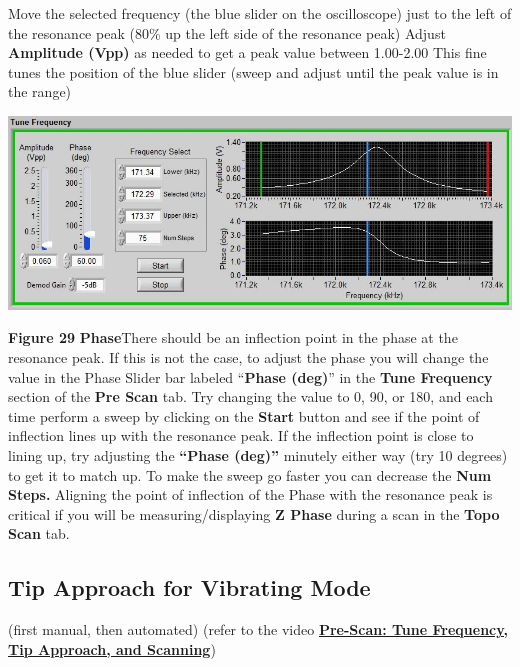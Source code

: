 \documentclass{../lab}
\begin{document}
Move the selected frequency (the blue slider on the oscilloscope) just to the left of the resonance peak (80\% up the left side of the resonance peak)
Adjust \textbf{Amplitude (Vpp)} as needed to get a peak value between 1.00-2.00
This fine tunes the position of the blue slider
(sweep and adjust until the peak value is in the range)

\begin{center}
    \href{http://experimentationlab.berkeley.edu/sites/default/files/AFMImages/FreqPhase.JPG}{\includegraphics[width=0.5\linewidth]{images/FreqPhase.JPG}}
\end{center}


\textbf{Figure 29}
\textbf{P}\textbf{hase}
\textbf{​}There should be an inflection point in the phase at the resonance peak.
If this is not the case, to adjust the phase you will change the value in the Phase Slider bar labeled ``\textbf{Phase (deg)}'' in the \textbf{Tune Frequency }section of the \textbf{Pre Scan }tab.  Try changing the value to 0, 90, or 180, and each time perform a sweep by clicking on the \textbf{Start }button and see if the point of inflection lines up with the resonance peak.  If the inflection point is close to lining up, try adjusting the \textbf{``Phase (deg)'' }minutely either way (try 10 degrees) to get it to match up.  To make the sweep go faster you can decrease the \textbf{Num Steps.  }
Aligning the point of inflection of the Phase with the resonance peak is critical if you will be measuring/displaying \textbf{Z Phase }during a scan in the \textbf{Topo }\textbf{Scan }tab.

\subsection{Tip Approach for Vibrating Mode}
\label{subsec:TipApproach}

(first manual, then automated) (refer to the video \href{http://experimentationlab.berkeley.edu/sites/default/files/prescan\_final2.mp4}{\textbf{Pre-Scan: Tune Frequency, Tip Approach, and Scanning}})
\end{document}

